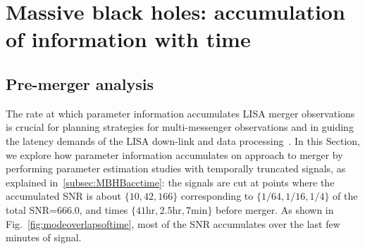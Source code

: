 \documentclass[aps,showpacs,twocolumn,prd,superscriptaddress,nofootinbib]{revtex4-1}
\newcommand{\be}{\begin{equation}}
\newcommand{\ee}{\end{equation}}
\newcommand\calA{{\mathcal{A}}}
\newcommand\varphiL{{\varphi_{L}}}
\newcommand\psiL{{\psi_{L}}}
\begin{document}
%
%


\section{Massive black holes: accumulation of information with time}
\label{sec:MBHBPEacctime}

\subsection{Pre-merger analysis}
\label{subsec:MBHBacctimePE}

The rate at which parameter information accumulates LISA merger observations is crucial for planning strategies for multi-messenger observations and in guiding the latency demands of the LISA down-link and data processing~\cite{ArmitageNatarajan02, DalCanton+19}. In this Section, we explore how parameter information accumulates on approach to merger by performing parameter estimation studies with temporally truncated signals, as explained in~\ref{subsec:MBHBacctime}: the signals are cut at points where the accumulated SNR is about $\{10,42,166\}$ corresponding to $\{1/64,1/16,1/4\}$ of the total SNR=$666.0$, and times $\{41 \mathrm{hr}, 2.5 \mathrm{hr}, 7 \mathrm{min}\}$ before merger. As shown in Fig.~\ref{fig:modeoverlapsoftime}, most of the SNR accumulates over the last few minutes of signal.
\end{document}
